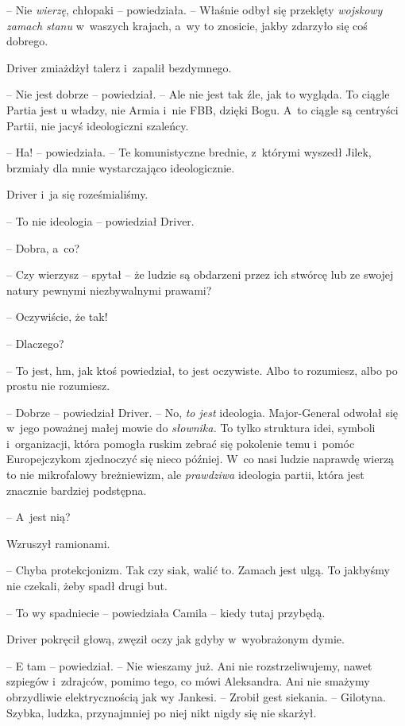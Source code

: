 \documentclass[oneside,polish,12pt,sfheadings]{mwbk}
\begin{document}
-- Nie \emph{wierzę}, chłopaki -- powiedziała. -- Właśnie odbył się
przeklęty \emph{wojskowy zamach stanu} w~waszych krajach, a~wy to
znosicie, jakby zdarzyło się coś dobrego.

Driver zmiażdżył talerz i~zapalił bezdymnego.

-- Nie jest dobrze -- powiedział. -- Ale nie jest tak źle, jak to wygląda.
To ciągle Partia jest u władzy, nie Armia i~nie FBB, dzięki Bogu. A~to
ciągle są centryści Partii, nie jacyś ideologiczni szaleńcy.

-- Ha! -- powiedziała. -- Te komunistyczne brednie, z~którymi wyszedł
Jilek, brzmiały dla mnie wystarczająco ideologicznie.

Driver i~ja się roześmialiśmy.

-- To nie ideologia -- powiedział Driver.

-- Dobra, a~co?

-- Czy wierzysz -- spytał -- że ludzie są obdarzeni przez ich stwórcę lub
ze swojej natury pewnymi niezbywalnymi prawami?

-- Oczywiście, że tak!

-- Dlaczego?

-- To jest, hm, jak ktoś powiedział, to jest oczywiste. Albo to
rozumiesz, albo po prostu nie rozumiesz.

-- Dobrze -- powiedział Driver. -- No, \emph{to jest} ideologia.
Major-General odwołał się w~jego poważnej małej mowie do \emph{słownika.
} To tylko struktura idei, symboli i~organizacji, która pomogła ruskim
zebrać się pokolenie temu i~pomóc Europejczykom zjednoczyć się nieco
później. W~co nasi ludzie naprawdę wierzą to nie mikrofalowy
breżniewizm, ale \emph{prawdziwa} ideologia partii, która jest znacznie
bardziej podstępna.

-- A~jest nią?

Wzruszył ramionami. 

-- Chyba protekcjonizm. Tak czy siak, walić to.
Zamach jest ulgą. To jakbyśmy nie czekali, żeby spadł drugi but.

-- To wy spadniecie -- powiedziała Camila -- kiedy tutaj przybędą.

Driver pokręcił głową, zwęził oczy jak gdyby w~wyobrażonym dymie.

-- E tam -- powiedział. -- Nie wieszamy już. Ani nie rozstrzeliwujemy,
nawet szpiegów i~zdrajców, pomimo tego, co mówi Aleksandra. Ani nie
smażymy obrzydliwie elektrycznością jak wy Jankesi. -- Zrobił gest
siekania. -- Gilotyna. Szybka, ludzka, przynajmniej po niej nikt nigdy
się nie skarżył.
\end{document}
